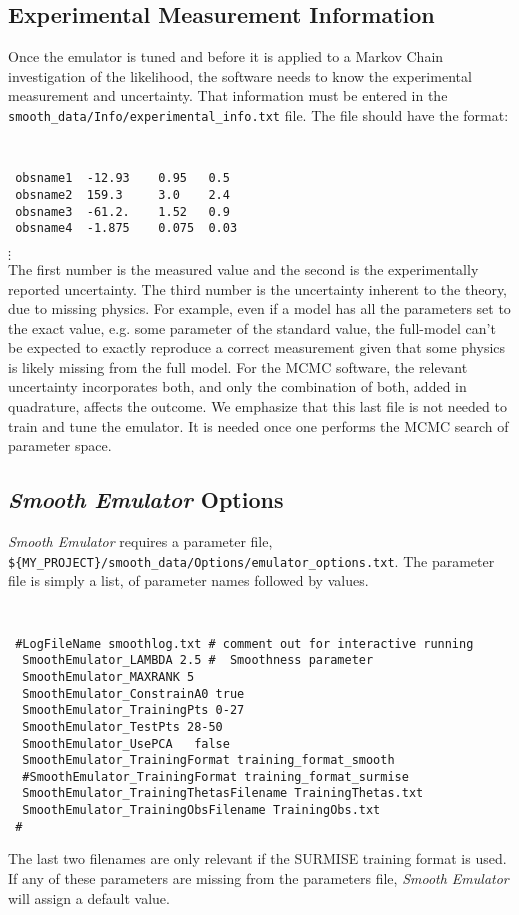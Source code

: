 \documentclass[UserManual.tex]{subfiles}
\begin{document}
\begin{enumerate}
\subsection{Experimental Measurement Information}
Once the emulator is tuned and before it is applied to a Markov Chain investigation of the likelihood, the software needs to know the experimental measurement and uncertainty. That information must be entered in the {\tt smooth\_data/Info/experimental\_info.txt} file. The file should have the format:
{\tt
\begin{verbatim}
 obsname1  -12.93    0.95   0.5
 obsname2  159.3     3.0    2.4
 obsname3  -61.2.    1.52   0.9
 obsname4  -1.875    0.075  0.03
\end{verbatim}}
\vspace*{-16pt}
 \hspace*{28pt}$\vdots$\\
The first number is the measured value and the second is the experimentally reported uncertainty. The third number is the uncertainty inherent to the theory, due to missing physics. For example, even if a model has all the parameters set to the exact value, e.g. some parameter of the standard value, the full-model can't be expected to exactly reproduce a correct measurement given that some physics is likely missing from the full model. For the MCMC software, the relevant uncertainty incorporates both, and only the combination of both, added in quadrature, affects the outcome. We emphasize that this last file is not needed to train and tune the emulator. It is needed once one performs the MCMC search of parameter space. 


\end{enumerate}

\subsection{{\it Smooth Emulator} Options}

{\it Smooth Emulator} requires a parameter file,\\
{\tt \$\{MY\_PROJECT\}/smooth\_data/Options/emulator\_options.txt}. The parameter file is simply a list, of parameter names followed by values. 

{\tt
\begin{verbatim}
 #LogFileName smoothlog.txt # comment out for interactive running
  SmoothEmulator_LAMBDA 2.5 #  Smoothness parameter
  SmoothEmulator_MAXRANK 5
  SmoothEmulator_ConstrainA0 true
  SmoothEmulator_TrainingPts 0-27
  SmoothEmulator_TestPts 28-50
  SmoothEmulator_UsePCA   false
  SmoothEmulator_TrainingFormat training_format_smooth
  #SmoothEmulator_TrainingFormat training_format_surmise
  SmoothEmulator_TrainingThetasFilename TrainingThetas.txt
  SmoothEmulator_TrainingObsFilename TrainingObs.txt
 #
\end{verbatim}
}
The last two filenames are only relevant if the SURMISE training format is used. If any of these parameters are missing from the parameters file, {\it Smooth Emulator} will assign a default value.
\end{document}
